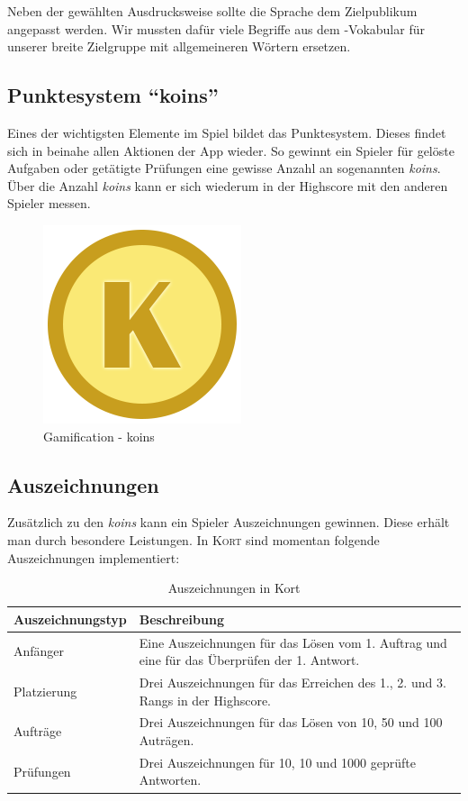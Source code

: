 Neben der gewählten Ausdrucksweise sollte die Sprache dem Zielpublikum angepasst werden.
Wir mussten dafür viele Begriffe aus dem -Vokabular für unserer breite Zielgruppe mit allgemeineren Wörtern ersetzen.

\subsection{Punktesystem "`koins"'}
Eines der wichtigsten Elemente im Spiel bildet das Punktesystem. Dieses findet sich in beinahe allen Aktionen der App wieder.
So gewinnt ein Spieler für gelöste Aufgaben oder getätigte Prüfungen eine gewisse Anzahl an sogenannten \emph{koins}.
Über die Anzahl \emph{koins} kann er sich wiederum in der Highscore mit den anderen Spieler messen.

\begin{figure}[H]
	\centering
	\includegraphics[scale=0.4]{images/gamification/gamification-koin}
	\caption{Gamification - koins}
	\label{gamification-koins}
\end{figure}

\subsection{Auszeichnungen}
Zusätzlich zu den \emph{koins} kann ein Spieler Auszeichnungen gewinnen. Diese erhält man durch besondere Leistungen. In \textsc{Kort} sind momentan folgende Auszeichnungen implementiert:

\begin{table}[H]
\centering
\begin{tabular}{|p{0.25\twocelltabwidth}|p{0.75\twocelltabwidth}|}
\hline 
\textbf{Auszeichnungstyp} & \textbf{Beschreibung} \\ 
\hline 
Anfänger & Eine Auszeichnungen für das Lösen vom 1. Auftrag und eine für das Überprüfen der 1. Antwort. \\ 
\hline 
Platzierung & Drei Auszeichnungen für das Erreichen des 1., 2. und 3. Rangs in der Highscore. \\ 
\hline 
Aufträge & Drei Auszeichnungen für das Lösen von 10, 50 und 100 Auträgen. \\ 
\hline 
Prüfungen & Drei Auszeichnungen für 10, 10 und 1000 geprüfte Antworten. \\ 
\hline 
\end{tabular} 
\caption{Auszeichnungen in Kort}
\label{kort-badges}
\end{table}

